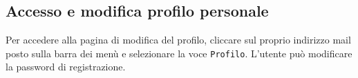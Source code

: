	\nyi

	\subsection{Accesso e modifica profilo personale}
	\label{modificaprofilo}
	Per accedere alla pagina di modifica del profilo, cliccare sul proprio indirizzo mail posto sulla barra dei menù e selezionare la voce \texttt{Profilo}. L'utente può modificare la password di registrazione.

	\nyi